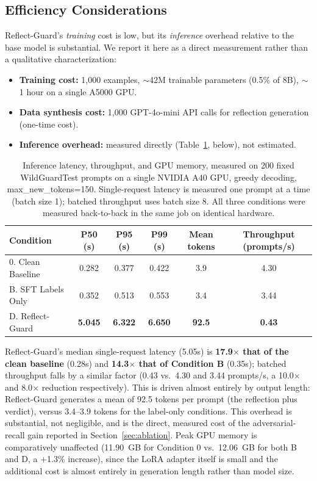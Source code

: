 \documentclass[superintelligence,article,submit,pdftex,moreauthors]{Definitions/mdpi}
\begin{document}
\subsection{Efficiency Considerations}
\label{sec:efficiency}

Reflect-Guard's \emph{training} cost is low, but its \emph{inference} overhead relative to the base model is substantial. We report it here as a direct measurement rather than a qualitative characterization:
\begin{itemize}[leftmargin=*, nosep]
  \item \textbf{Training cost:} 1{,}000 examples, $\sim$42M trainable parameters (0.5\% of 8B), $\sim$1 hour on a single A5000 GPU.
  \item \textbf{Data synthesis cost:} 1{,}000 GPT-4o-mini API calls for reflection generation (one-time cost).
  \item \textbf{Inference overhead:} measured directly (Table~\ref{tab:latency}, below), not estimated.
\end{itemize}

\begin{table}[H]
  \caption{Inference latency, throughput, and GPU memory, measured on 200 fixed WildGuardTest prompts on a single NVIDIA A40 GPU, greedy decoding, max\_new\_tokens=150. Single-request latency is measured one prompt at a time (batch size 1); batched throughput uses batch size 8. All three conditions were measured back-to-back in the same job on identical hardware.\label{tab:latency}}
  \centering
  \small
  \begin{tabular}{lccccc}
    \toprule
    Condition & P50 (s) & P95 (s) & P99 (s) & Mean tokens & Throughput (prompts/s) \\
    \midrule
    0. Clean Baseline & 0.282 & 0.377 & 0.422 & 3.9 & 4.30 \\
    B. SFT Labels Only & 0.352 & 0.513 & 0.553 & 3.4 & 3.44 \\
    D. Reflect-Guard & \textbf{5.045} & \textbf{6.322} & \textbf{6.650} & \textbf{92.5} & \textbf{0.43} \\
    \bottomrule
  \end{tabular}
\end{table}

Reflect-Guard's median single-request latency (5.05s) is \textbf{17.9$\times$ that of the clean baseline} (0.28s) and \textbf{14.3$\times$ that of Condition B} (0.35s); batched throughput falls by a similar factor (0.43 vs.\ 4.30 and 3.44 prompts/s, a 10.0$\times$ and 8.0$\times$ reduction respectively). This is driven almost entirely by output length: Reflect-Guard generates a mean of 92.5 tokens per prompt (the reflection plus verdict), versus 3.4--3.9 tokens for the label-only conditions. This overhead is substantial, not negligible, and is the direct, measured cost of the adversarial-recall gain reported in Section~\ref{sec:ablation}. Peak GPU memory is comparatively unaffected (11.90~GB for Condition 0 vs.\ 12.06~GB for both B and D, a $+$1.3\% increase), since the LoRA adapter itself is small and the additional cost is almost entirely in generation length rather than model size.
\end{document}
